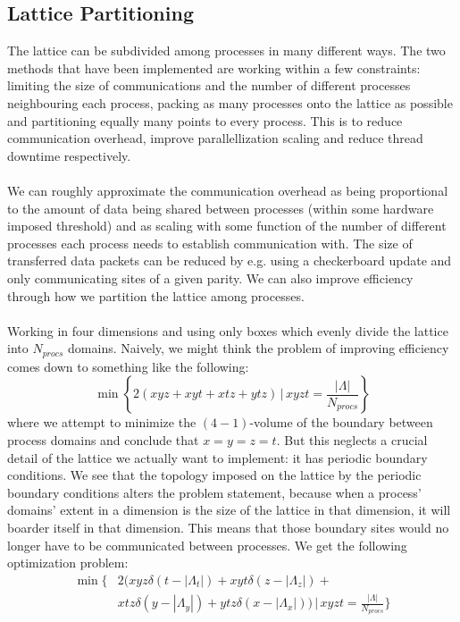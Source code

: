 \documentclass[a4paper,10pt]{book}
\begin{document}
\subsection{Lattice Partitioning}
The lattice can be subdivided among processes in many different ways. The two methods that have been implemented are working within a few constraints: limiting the size of communications and the number of different processes neighbouring each process, packing as many processes onto the lattice as possible and partitioning equally many points to every process. This is to reduce communication overhead, improve parallellization scaling and reduce thread downtime respectively.\\\\We can roughly approximate the communication overhead as being proportional to the amount of data being shared between processes (within some hardware imposed threshold) and as scaling with some function of the number of different processes each process needs to establish communication with. The size of transferred data packets can be reduced by e.g. using a checkerboard update and only communicating sites of a given parity. We can also improve efficiency through how we partition the lattice among processes.\\\\Working in four dimensions and using only boxes which evenly divide the lattice into $N_{procs}$ domains. Naively, we might think the problem of improving efficiency comes down to something like the following:
\begin{equation*}
\operatorname{min}\left\{  2(xyz + xyt + xtz + ytz) \,\Big|\,xyzt = \frac{|\Lambda|}{N_{procs}}\right\}
\end{equation*}
where we attempt to minimize the $(4-1)$-volume of the boundary between process domains and conclude that $x=y=z=t$. But this neglects a crucial detail of the lattice we actually want to implement: it has periodic boundary conditions. We see that the topology imposed on the lattice by the periodic boundary conditions alters the problem statement, because when a process' domains' extent in a dimension is the size of the lattice in that dimension, it will boarder itself in that dimension. This means that those boundary sites would no longer have to be communicated between processes. We get the following optimization problem:
\begin{equation*}
\begin{aligned}
\operatorname{min}\Big\{  &2(xyz\delta(t-|\Lambda_t|) + xyt\delta(z-|\Lambda_z|) + \\
 & xtz\delta(y-|\Lambda_y|) + ytz\delta(x-|\Lambda_x|)) \,\Big|\,xyzt = \frac{|\Lambda|}{N_{procs}} \Big\}
\end{aligned}
\end{equation*}
\end{document}
